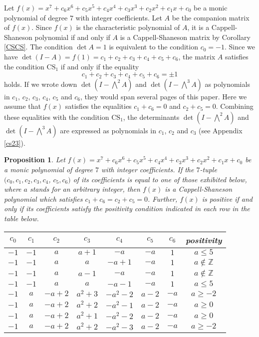 \documentclass{amsart}
\theoremstyle{plain}
\newtheorem{prop}[thm]{Proposition}
\theoremstyle{definition}
\theoremstyle{remark}
\begin{document}
Let $f(x)=x^7+c_6x^6+c_5x^5+c_4x^4+c_3x^3+c_2x^2+c_1x+c_0$ be 
a monic polynomial of degree $7$ with integer coefficients. 
Let $A$ be the companion matrix of $f(x)$. 
Since $f(x)$ is the characteristic polynomial of $A$, it is a Cappell-Shaneson polynomial 
if and only if $A$ is a Cappell-Shaneson matrix by Corollary \ref{CSCS}. 
The condition $\det A=1$ is equivalent to the condition $c_0=-1$. 
Since we have $\det(I-A)=f(1)=c_1+c_2+c_3+c_4+c_5+c_6$, 
the matrix $A$ satisfies the condition $\mathrm{CS}_1$ if and only if the equality 
\begin{equation*}
c_1+c_2+c_3+c_4+c_5+c_6=\pm 1 
\end{equation*}
holds. 
If we wrote down $\det(I-\bigwedge^2A)$ and $\det(I-\bigwedge^3A)$ as polynomials in $c_1$, 
$c_2$, $c_3$, $c_4$, $c_5$ and $c_6$, they would span several pages of this paper. 
Here we assume that $f(x)$ satisfies the equalities $c_1+c_6=0$ and $c_2+c_5=0$. 
Combining these equalities with the condition $\mathrm{CS}_1$, 
the determinants $\det(I-\bigwedge^2A)$ and $\det(I-\bigwedge^3A)$ are expressed as polynomials in 
$c_1$, $c_2$ and $c_3$ (see Appendix \ref{cs23}). 

\begin{prop}\label{CS7}
Let $f(x)=x^7+c_6x^6+c_5x^5+c_4x^4+c_3x^3+c_2x^2+c_1x+c_0$ be 
a monic polynomial of degree $7$ with integer coefficients. 
If the $7$-tuple $(c_0,c_1,c_2,c_3,c_4$, $c_5,c_6)$ of 
its coefficients is equal to one of those exhibited below, 
where $a$ stands for an arbitrary integer, 
then $f(x)$ is a Cappell-Shaneson polynomial which satisfies $c_1+c_6=c_2+c_5=0$. 
Further, $f(x)$ is positive if and only if its coefficients satisfy 
the positivity condition indicated in each row in the table below. 
\begin{small}
\begin{longtable}{|c|c|c|c|c|c|c|c|} \hline 
$c_0$ & $c_1$ & $c_2$ & $c_3$ & $c_4$ & $c_5$ & $c_6$ & {\rm positivity} \\ \hline 
$-1$ & $-1$ & $a$ & $a+1$ & $-a$ & $-a$ & $1$ &  $a\leq 5$ \\ \hline
$-1$ & $-1$ & $a$ & $a$ & $-a+1$ & $-a$ & $1$ &  $a\notin \mathbb{Z}$ \\ \hline
$-1$ & $-1$ & $a$ & $a-1$ & $-a$ & $-a$ & $1$ &  $a\notin \mathbb{Z}$ \\ \hline
$-1$ & $-1$ & $a$ & $a$ & $-a-1$ & $-a$ & $1$ &  $a\leq 5$ \\ \hline
$-1$ & $a$ & $-a+2$ & $a^2+3$ & $-a^2-2$ & $a-2$ & $-a$ &  $a\geq -2$ \\ \hline
$-1$ & $a$ & $-a+2$ & $a^2+2$ & $-a^2-1$ & $a-2$ & $-a$ &  $a\geq 0$ \\ \hline
$-1$ & $a$ & $-a+2$ & $a^2+1$ & $-a^2-2$ & $a-2$ & $-a$ &  $a\geq 0$ \\ \hline
$-1$ & $a$ & $-a+2$ & $a^2+2$ & $-a^2-3$ & $a-2$ & $-a$ &  $a\geq -2$ \\ \hline
\end{longtable} 
\end{small}
\end{prop}
\end{document}
